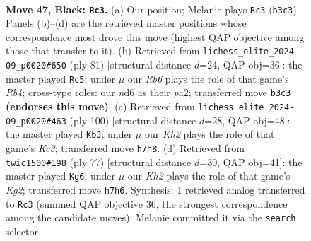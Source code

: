 \documentclass[11pt]{article}
\begin{document}
\clearpage

\begin{figure}[p]\centering
\begin{subfigure}{0.46\textwidth}\centering
\resizebox{\linewidth}{!}{%
\newchessgame
\chessboard[
  setfen={8/6pk/1R1Npp2/7p/1p1P1P1P/1r2P1PK/8/8 b - - 3 47},
  showmover=false,
  pgfstyle=straightmove, color=movearrow, markmove={b3-c3}
]}
\caption{}
\end{subfigure}\hfill
\begin{subfigure}{0.46\textwidth}\centering
\resizebox{\linewidth}{!}{%
\newchessgame
\chessboard[
  setfen={8/R3pk2/1p1p4/1r4p1/7p/1P3P1P/P4KP1/8 b - - 0 41},
  showmover=false,
  pgfstyle=straightmove, color=movearrow, markmove={b5-c5}
]}
\caption{}
\end{subfigure}
\\[4pt]
\begin{subfigure}{0.46\textwidth}\centering
\resizebox{\linewidth}{!}{%
\newchessgame
\chessboard[
  setfen={8/6p1/R3pk2/P4p1p/4p2P/2K1P1P1/r4P2/8 w - - 3 51},
  showmover=false,
  pgfstyle=straightmove, color=movearrow, markmove={c3-b3}
]}
\caption{}
\end{subfigure}\hfill
\begin{subfigure}{0.46\textwidth}\centering
\resizebox{\linewidth}{!}{%
\newchessgame
\chessboard[
  setfen={8/2R2pk1/2p2r2/1p1p2p1/1P1P2P1/3KPP2/8/8 b - - 2 39},
  showmover=false,
  pgfstyle=straightmove, color=movearrow, markmove={g7-g6}
]}
\caption{}
\end{subfigure}
\caption{\textbf{Move 47, Black: \texttt{Rc3}.} (a) Our position; Melanie plays \texttt{Rc3} (\texttt{b3c3}). Panels (b)--(d) are the retrieved master positions whose correspondence most drove this move (highest QAP objective among those that transfer to it). (b) Retrieved from \texttt{lichess\_elite\_2024-09\_p0020\#650} (ply 81) [structural distance $d$=24, QAP obj=36]: the master played \texttt{Rc5}; under $\mu$ our \emph{Rb6} plays the role of that game's \emph{Rb4}; cross-type roles: our \emph{n}d6 as their \emph{p}a2; transferred move \texttt{b3c3} \textbf{(endorses this move)}. (c) Retrieved from \texttt{lichess\_elite\_2024-09\_p0020\#463} (ply 100) [structural distance $d$=28, QAP obj=48]: the master played \texttt{Kb3}; under $\mu$ our \emph{Kh2} plays the role of that game's \emph{Kc3}; transferred move \texttt{h7h8}. (d) Retrieved from \texttt{twic1500\#198} (ply 77) [structural distance $d$=30, QAP obj=41]: the master played \texttt{Kg6}; under $\mu$ our \emph{Kh2} plays the role of that game's \emph{Kg2}; transferred move \texttt{h7h6}. Synthesis: 1 retrieved analog transferred to \texttt{Rc3} (summed QAP objective 36, the strongest correspondence among the candidate moves); Melanie committed it via the \texttt{search} selector.}
\label{fig:thought-m93}
\end{figure}
\end{document}
